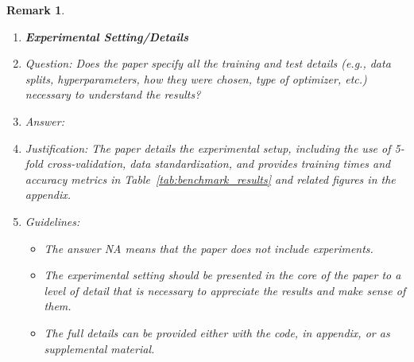 \documentclass{article}
\newtheorem{remark}{Remark}
\begin{document}
\begin{remark}
\begin{enumerate}
\item {\bf Experimental Setting/Details}
    \item[] Question: Does the paper specify all the training and test details (e.g., data splits, hyperparameters, how they were chosen, type of optimizer, etc.) necessary to understand the results?
    \item[] Answer: \answerYes{}
    \item[] Justification: The paper details the experimental setup, including the use of 5-fold cross-validation, data standardization, and provides training times and accuracy metrics in Table~\ref{tab:benchmark_results} and related figures in the appendix.
    \item[] Guidelines:
    \begin{itemize}
        \item The answer NA means that the paper does not include experiments.
        \item The experimental setting should be presented in the core of the paper to a level of detail that is necessary to appreciate the results and make sense of them.
        \item The full details can be provided either with the code, in appendix, or as supplemental material.
    \end{itemize}


\end{enumerate}
\end{remark}
\end{document}
